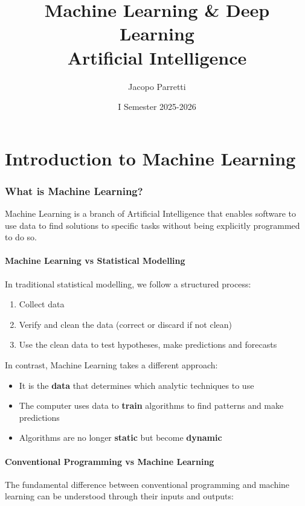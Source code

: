 \documentclass[11pt,a4paper]{article}
\title{\textbf{Machine Learning \& Deep Learning}\\
\large Artificial Intelligence}
\author{Jacopo Parretti}
\date{I Semester 2025-2026}
\theoremstyle{definition}
\theoremstyle{plain}
\theoremstyle{remark}
\begin{document}
\maketitle
\newpage
\tableofcontents
\newpage

\part{Introduction to Machine Learning}

\section{What is Machine Learning?}

Machine Learning is a branch of Artificial Intelligence that enables software to use data to find solutions to specific tasks without being explicitly programmed to do so.

\subsection{Machine Learning vs Statistical Modelling}

In traditional statistical modelling, we follow a structured process:
\begin{enumerate}
    \item Collect data
    \item Verify and clean the data (correct or discard if not clean)
    \item Use the clean data to test hypotheses, make predictions and forecasts
\end{enumerate}

In contrast, Machine Learning takes a different approach:
\begin{itemize}
    \item It is the \textbf{data} that determines which analytic techniques to use
    \item The computer uses data to \textbf{train} algorithms to find patterns and make predictions
    \item Algorithms are no longer \textbf{static} but become \textbf{dynamic}
\end{itemize}

\subsection{Conventional Programming vs Machine Learning}

The fundamental difference between conventional programming and machine learning can be understood through their inputs and outputs:
\end{document}
